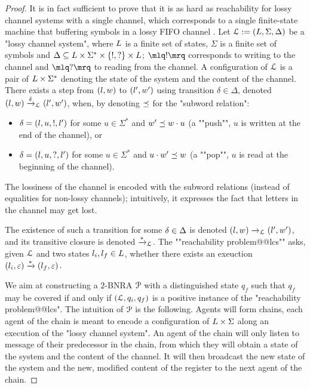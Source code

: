 \ifproofs
\begin{proof}
It is in fact sufficient to prove that it is as hard as reachability for lossy channel systems with a single channel, which corresponds to a single finite-state machine that buffering symbols in a lossy FIFO channel \cite{Schnoebelen2002verifying}.
Let $\mathcal{L} := (L,\Sigma,\Delta)$ be a "lossy channel system", where $L$ is a finite set of states, $\Sigma$ is a finite set of symbols and $\Delta \subseteq L \times \Sigma^* \times \{!, ?\} \times L$; $\quotemarks{!}$ corresponds to writing to the channel and $\quotemarks{?}$ to reading from the channel. A configuration of $\mathcal{L}$ is a pair of $L \times \Sigma^*$ denoting the state of the system and the content of the channel. There exists a step from $(l,w)$ to $(l',w')$ using transition $\delta \in \Delta$, denoted $(l,w) \xrightarrow{\delta}_{\mathcal{L}} (l',w')$, when, by denoting $\preceq$ for the "subword relation":
\begin{itemize}
\item $\delta = (l,u,!,l')$ for some $u \in \Sigma^*$ and $w' \preceq w \cdot u$ (a ""push"", $u$ is written at the end of the channel), or
\item $\delta = (l,u,?,l')$ for some $u \in \Sigma^*$ and $u \cdot w' \preceq w$ (a ""pop"", $u$ is read at the beginning of the channel).
\end{itemize}
The lossiness of the channel is encoded with the subword relations (instead of equalities for non-lossy channels); intuitively, it expresses the fact that letters in the channel may get lost. 

The existence of such a transition for some $\delta \in \Delta$ is denoted $(l,w) \xrightarrow{}_{\mathcal{L}} (l',w')$, and its transitive closure is denoted $\xrightarrow{*}_{\mathcal{L}}$. The ""reachability problem@@lcs"" asks, given $\mathcal{L}$ and two states $l_i, l_f \in L$, whether there exists an exeuction $(l_i,\varepsilon) \xrightarrow{*} (l_f, \varepsilon)$. 

We aim at constructing a $2$-BNRA $\mathcal{P}$ with a distinguished state $q_f$ such that $q_f$ may be covered if and only if $(\mathcal{L}, q_i, q_f)$ is a positive instance of the "reachability problem@@lcs".
The intuition of $\mathcal{P}$ is the following. Agents will form chains, each agent of the chain is meant to encode a configuration of $L \times \Sigma$ along an execution of the "lossy channel system". 
An agent of the chain will only listen to message of their predecessor in the chain, from which they will obtain a state of the system and the content of the channel. It will then broadcast the new state of the system and the new, modified content of the register to the next agent of the chain. 


\end{proof}
